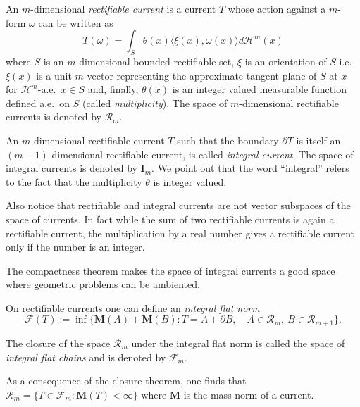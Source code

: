 \documentclass[12pt]{article}
\begin{document}
An $m$-dimensional \emph{rectifiable current} is a current $T$ whose action against a $m$-form $\omega$ can be written as
\[
  T(\omega) = \int_S \theta(x)\langle \xi(x),\omega(x)\rangle d\mathcal H^m(x)
\]
where $S$ is an $m$-dimensional bounded rectifiable set, $\xi$ is an orientation of $S$ i.e.\ $\xi(x)$ is a unit $m$-vector representing the approximate tangent plane of $S$ at $x$ for $\mathcal H^m$-a.e.\ $x\in S$ and, finally, $\theta(x)$ is an integer valued measurable function defined a.e.\ on $S$ (called \emph{multiplicity}).
The space of $m$-dimensional rectifiable currents is denoted by $\mathcal R_m$.

An $m$-dimensional rectifiable current $T$ such that the boundary $\partial T$ is itself an $(m-1)$-dimensional rectifiable current, is called \emph{integral current}. The space of integral currents is denoted by $\mathbf I_m$.
We point out that the word ``integral'' refers to the fact that the multiplicity $\theta$ is integer valued.

Also notice that rectifiable and integral currents are not vector subspaces of the space of currents. In fact while the sum of two rectifiable currents is again a rectifiable current, the multiplication by a real number gives a rectifiable current only if the number is an integer.

The compactness theorem makes the space of integral currents a good space where geometric problems can be ambiented.

On rectifiable currents one can define an \emph{integral flat norm}
\[
  \mathcal F(T) := \inf \{\mathbf M(A) + \mathbf M(B)\colon
   T=A+\partial B,\quad A\in \mathcal R_m,\ B\in\mathcal R_{m+1}\}.
\]

The closure of the space $\mathcal R_m$ under the integral flat norm is called the space of \emph{integral flat chains} and is denoted by $\mathcal F_m$.

As a consequence of the closure theorem, one finds that $\mathcal R_m = \{T\in \mathcal F_m\colon \mathbf M(T)<\infty\}$ where $\mathbf M$ is the mass norm of a current.
\end{document}
